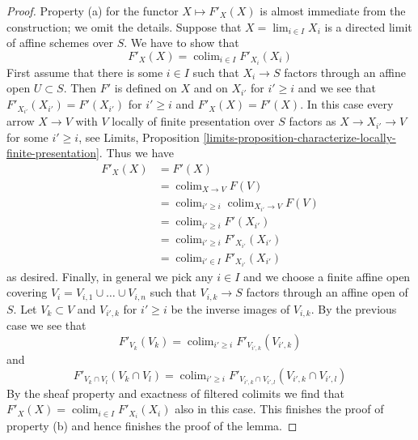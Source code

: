 \documentclass[10pt,a4paper]{amsart}
\theoremstyle{plain}
\theoremstyle{definition}
\theoremstyle{remark}
\numberwithin{equation}{subsection}
\def\lim{\mathop{\mathrm{lim}}\nolimits}
\def\colim{\mathop{\mathrm{colim}}\nolimits}
\begin{document}
\begin{proof}
\medskip\noindent
Property (a) for the functor $X \mapsto F'_X(X)$ is almost immediate
from the construction; we omit the details.
Suppose that $X = \lim_{i \in I} X_i$
is a directed limit of affine schemes over $S$. We have to show that
$$
F'_X(X) = \colim_{i \in I} F'_{X_i}(X_i)
$$
First assume that there is some $i \in I$ such that
$X_i \to S$ factors through an affine open $U \subset S$.
Then $F'$ is defined on $X$ and on $X_{i'}$ for $i' \geq i$
and we see that $F'_{X_{i'}}(X_{i'}) = F'(X_{i'})$ for
$i' \geq i$ and $F'_X(X) = F'(X)$. In this case every arrow
$X \to V$ with $V$ locally of finite presentation
over $S$ factors as $X \to X_{i'} \to V$ for some
$i' \geq i$, see Limits, Proposition
\ref{limits-proposition-characterize-locally-finite-presentation}.
Thus we have
\begin{align*}
F'_X(X)
& =
F'(X)  \\
& = \colim_{X \to V} F(V) \\
& =
\colim_{i' \geq i} \colim_{X_{i'} \to V} F(V) \\
& =
\colim_{i' \geq i} F'(X_{i'}) \\
& =
\colim_{i' \geq i} F'_{X_{i'}}(X_{i'}) \\
& =
\colim_{i' \in I} F'_{X_{i'}}(X_{i'})
\end{align*}
as desired. Finally, in general we pick any $i \in I$ and we choose
a finite affine open covering $V_i = V_{i, 1} \cup \ldots \cup V_{i, n}$
such that $V_{i, k} \to S$ factors through an affine open of $S$.
Let $V_k \subset V$ and $V_{i', k}$ for $i' \geq i$
be the inverse images of $V_{i, k}$.
By the previous case we see that
$$
F'_{V_k}(V_k) = \colim_{i' \geq i} F'_{V_{i', k}}(V_{i', k})
$$
and
$$
F'_{V_k \cap V_l}(V_k \cap V_l) =
\colim_{i' \geq i}
F'_{V_{i', k} \cap V_{i', l}}(V_{i', k} \cap V_{i', l})
$$
By the sheaf property and exactness of filtered colimits
we find that $F'_X(X) = \colim_{i \in I} F'_{X_i}(X_i)$
also in this case. This finishes the proof of property (b)
and hence finishes the proof of the lemma.
\end{proof}
\end{document}
